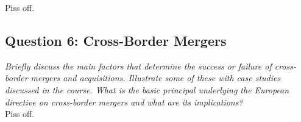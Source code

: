\documentclass[11pt, english]{article}
\begin{document}
	Piss off.

	\newpage

	\subsection{Question 6: Cross-Border Mergers}

	\textit{Briefly discuss the main factors that determine the success or failure of cross- border mergers and acquisitions. Illustrate some of these with case studies discussed in the course. What is the basic principal underlying the European directive on cross-border mergers and what are its implications?}\\

	Piss off.
\end{document}
